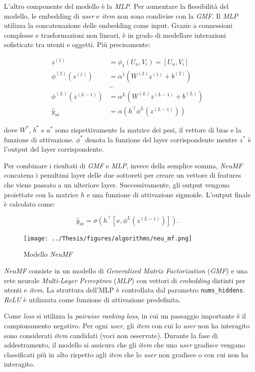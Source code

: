 L'altro componente del modello è la \textit{MLP}. Per aumentare la flessibilità del modello, le embedding di \textit{user} e \textit{item} non sono condivise con la \textit{GMF}. Il \textit{MLP} utilizza la concatenazione delle embedding come input. Grazie a connessioni complesse e trasformazioni non lineari, è in grado di modellare interazioni sofisticate tra utenti e oggetti. Più precisamente:

\[
\begin{aligned}
z^{(1)} &= \phi_1(U_u, V_i) = \left[ U_u, V_i \right] \\
\phi^{(2)}(z^{(1)}) &= \alpha^1(W^{(2)} z^{(1)} + b^{(2)}) \\
&\dots \\
\phi^{(L)}(z^{(L-1)}) &= \alpha^L(W^{(L)} z^{(L-1)} + b^{(L)}) \\
\hat{y}_{ui} &= \alpha(h^\top \phi^L(z^{(L-1)}))
\end{aligned}
\]


dove $W^*$, $b^*$ e $a^*$ sono rispettivamente la matrice dei pesi, il vettore di bias e la funzione di attivazione. $\phi^*$ denota la funzione del layer corrispondente mentre $z^*$ è l'output del layer corrispondente.

Per combinare i risultati di \textit{GMF} e \textit{MLP}, invece della semplice somma, \textit{NeuMF} concatena i penultimi layer delle due sottoreti per creare un vettore di features che viene passato a un ulteriore layer. Successivamente, gli output vengono proiettate con la matrice $h$ e una funzione di attivazione sigmoide. L'output finale è calcolato come:

\[
\hat{y}_{ui} = \sigma(h^\top[x, \phi^L(z^{(L-1)})]).
\]

\begin{figure}[H]
    \centering
    \texttt{[image: ../Thesis/figures/algorithms/neu\_mf.png]}
    \caption{Modello \textit{NeuMF}}
    \label{fig:neu_mf}
\end{figure}

\textit{NeuMF} consiste in un modello di \textit{Generalized Matrix Factorization} (\textit{GMF}) e una rete neurale \textit{Multi-Layer Perceptron} (\textit{MLP}) con vettori di \textit{embedding} distinti per utenti e \textit{item}. La struttura dell'MLP è controllata dal parametro \texttt{nums\_hiddens}. \textit{ReLU} è utilizzata come funzione di attivazione predefinita.

Come \textit{loss} si utilizza la \textit{pairwise ranking loss}, in cui un passaggio importante è il campionamento negativo. Per ogni \textit{user}, gli \textit{item} con cui lo \textit{user} non ha interagito sono considerati \textit{item} candidati (voci non osservate). Durante la fase di addestramento, il modello si assicura che gli \textit{item} che uno \textit{user} gradisce vengano classificati più in alto rispetto agli \textit{item} che lo \textit{user} non gradisce o con cui non ha interagito.

